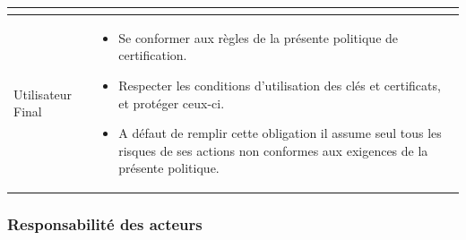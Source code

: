 \documentclass[a4paper,11pt,french]{book}
\begin{document}
\begin{tabular}{|l|p{10cm}|}
\begin{itemize}
 
 \end{itemize} 
  
 \\
 \hline
 Utilisateur Final &
 \begin{itemize}
 \item Se conformer aux règles de la présente politique de certification.
\item Respecter les conditions d'utilisation des clés et certificats, et protéger ceux-ci.
\item A défaut de remplir cette obligation il assume seul tous les risques de ses actions non conformes aux exigences de la présente politique.
 
 \end{itemize}
\\
\hline
  
\end{tabular}
\subsubsection{Responsabilité des acteurs}
\end{document}
